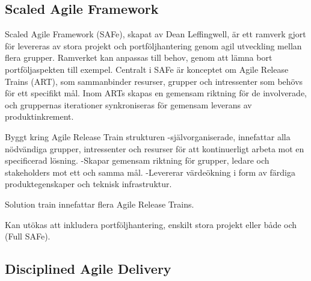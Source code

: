 	\subsection{Scaled Agile Framework}
		
		Scaled Agile Framework (SAFe), skapat av Dean Leffingwell, är ett ramverk gjort för levereras av stora projekt och portföljhantering genom agil utveckling mellan flera grupper. Ramverket kan anpassas till behov, genom att lämna bort portföljaspekten till exempel.
		Centralt i SAFe är konceptet om Agile Release Trains (ART), som sammanbinder resurser, grupper och intressenter som behövs för ett specifikt mål. Inom ARTs skapas en gemensam riktning för de involverade, och gruppernas iterationer synkroniseras för gemensam leverans av produktinkrement.
		
		Byggt kring Agile Release Train strukturen
		-självorganiserade, innefattar alla nödvändiga grupper, intressenter och resurser för att kontinuerligt arbeta mot en specificerad lösning.
		-Skapar gemensam riktning för grupper, ledare och stakeholders mot ett och samma mål.
		-Levererar värdeökning i form av färdiga produktegenskaper och teknisk infrastruktur.

		Solution train innefattar flera Agile Release Trains.
		
		Kan utökas att inkludera portföljhantering, enskilt stora projekt eller både och (Full SAFe).
		
		
			
		
	\subsection{Disciplined Agile Delivery}
			
